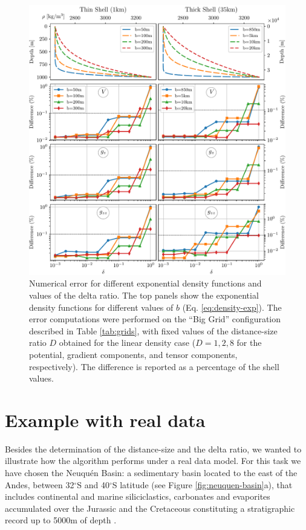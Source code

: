 \documentclass[extra]{gji}
\begin{document}
\begin{figure}
\centering
\includegraphics[width=\linewidth]{figures/exponential-delta.pdf}
\caption{
    Numerical error for different exponential density functions and values of the delta
    ratio.
    The top panels show the exponential density functions for different values of $b$
    (Eq. \ref{eq:density-exp}).
    The error computations were performed on the ``Big Grid'' configuration described in
    Table \ref{tab:grids}, with fixed values of the distance-size ratio
    $D$ obtained for the linear density case ($D=1, 2, 8$ for the
    potential, gradient components, and tensor components, respectively).
    The difference is reported as a percentage of the shell values.
    }
\label{fig:delta-exponential}
\end{figure}



\section{Example with real data}

Besides the determination of the distance-size and the delta ratio, we
wanted to illustrate how the algorithm performs under a real data model.
For this task we have chosen the Neuqu\'en Basin: a sedimentary basin
located to the east of the Andes, between 32$^\circ$S and 40$^\circ$S latitude
(see Figure \ref{fig:neuquen-basin}a), that includes continental and marine
siliciclastics, carbonates and evaporites accumulated over the Jurassic and
the Cretaceous constituting a stratigraphic record up to 5000m of depth
\citep{Howell2005}.
\end{document}
